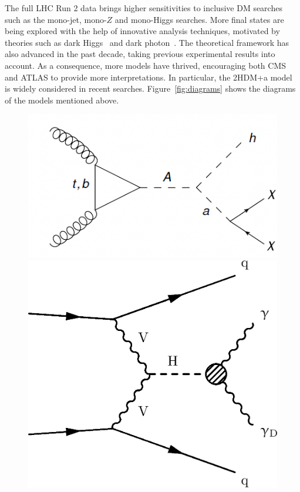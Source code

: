 \documentclass{moriond}
\begin{document}
The full LHC Run 2 data brings higher
sensitivities to inclusive DM searches such as the mono-jet, mono-$Z$ and
mono-Higgs searches. More final states are being explored with the help of
innovative analysis techniques, motivated by theories such as dark
Higgs~\cite{DarkH} and dark photon~\cite{DarkPh}. The
theoretical framework has also advanced in the past decade, taking previous
experimental results into account. As a consequence, more models have thrived,
encouraging both CMS and ATLAS to provide more interpretations. In particular,
the 2HDM+a model~\cite{2HDM} is widely considered in recent searches.
Figure~\ref{fig:diagrams} shows the diagrams of the models mentioned above.

\begin{figure} [htb]
\begin{minipage}{0.32\linewidth}
\centerline{\includegraphics[width=0.7\linewidth]{2HDM_a}}
\end{minipage}
\begin{minipage}{0.32\linewidth}
\centerline{\includegraphics[width=0.7\linewidth]{HiggsDarkPhotonDiagram}}
\end{minipage}
\begin{minipage}{0.32\linewidth}

\end{minipage}
\end{figure}
\end{document}
